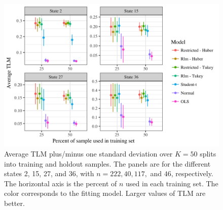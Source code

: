 \documentclass[ba]{imsart}
\newcommand{\by}{\mbox{\boldmath $y$}}
\begin{document}

\begin{figure}[t]
\centering
\includegraphics[width=6in]{tlm_base_Student-t.png}
\caption{Average TLM plus/minus one standard deviation over $K = 50$ splits into training and holdout samples. The panels are for the different states  2, 15, 27, and 36, with $n = 222, 40, 117,$ and $46$, respectively. The horizontal axis is the percent of $n$ used in each training set. The color corresponds to the fitting model.  Larger values of TLM are better.}
\label{fig:tlm}
\end{figure}
\end{document}
